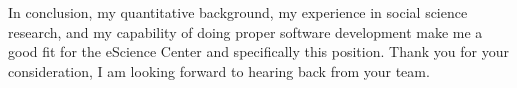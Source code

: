 \documentclass[11pt, a4paper]{awesome-cv}
\begin{document}
\begin{cvletter}
In conclusion, my quantitative background, my experience in social science research,
and my capability of doing proper software development make me a good fit
for the eScience Center and specifically this position.
Thank you for your consideration, I am looking forward to hearing back from your team.


\end{cvletter}


\makeletterclosing
\end{document}
